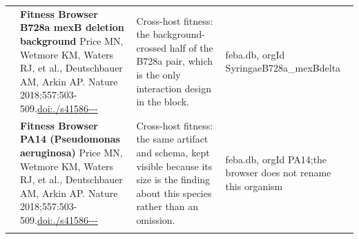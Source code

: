\begin{landscape}
\begin{longtable}{@{}r@{\hspace{4pt}} L{78mm} L{72mm} L{76mm}@{}}
 & \textbf{Fitness Browser B728a mexB deletion background} \newline Price MN, Wetmore KM, Waters RJ, et al., Deutschbauer AM, Arkin AP. Nature 2018;557:503-509.\newline \href{https://doi.org/10.1038/s41586-018-0124-0}{doi:./\allowbreak s41586---} & Cross-host fitness: the background-crossed half of the B728a pair, which is the only interaction design in the block. & feba.\allowbreak db, org\allowbreak Id Syrin\allowbreak gaeB728a\_\allowbreak mexBdel\allowbreak ta \\
 & \textbf{Fitness Browser PA14 (Pseudomonas aeruginosa)} \newline Price MN, Wetmore KM, Waters RJ, et al., Deutschbauer AM, Arkin AP. Nature 2018;557:503-509.\newline \href{https://doi.org/10.1038/s41586-018-0124-0}{doi:./\allowbreak s41586---} & Cross-host fitness: the same artifact and schema, kept visible because its size is the finding about this species rather than an omission. & feba.\allowbreak db, org\allowbreak Id PA14;\allowbreak  the bro\allowbreak wser doe\allowbreak s not re\allowbreak name thi\allowbreak s organi\allowbreak sm \\
\addlinespace[5pt]
\end{longtable}
\endgroup
\end{landscape}
